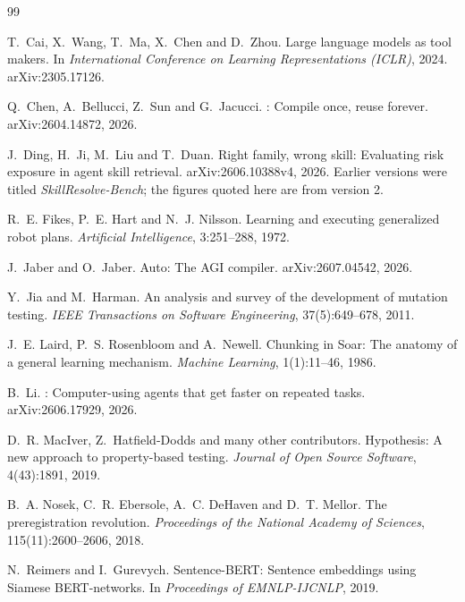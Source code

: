 \documentclass[11pt]{article}
\begin{document}
\begin{thebibliography}{99}

T.~Cai, X.~Wang, T.~Ma, X.~Chen and D.~Zhou.
\newblock Large language models as tool makers.
\newblock In \emph{International Conference on Learning Representations (ICLR)}, 2024.
\newblock arXiv:2305.17126.

Q.~Chen, A.~Bellucci, Z.~Sun and G.~Jacucci.
: Compile once, reuse forever.
\newblock arXiv:2604.14872, 2026.

J.~Ding, H.~Ji, M.~Liu and T.~Duan.
\newblock Right family, wrong skill: Evaluating risk exposure in agent skill retrieval.
\newblock arXiv:2606.10388v4, 2026. Earlier versions were titled \emph{SkillResolve-Bench}; the
figures quoted here are from version 2.

R.~E. Fikes, P.~E. Hart and N.~J. Nilsson.
\newblock Learning and executing generalized robot plans.
\newblock \emph{Artificial Intelligence}, 3:251--288, 1972.

J.~Jaber and O.~Jaber.
\newblock Auto: The {AGI} compiler.
\newblock arXiv:2607.04542, 2026.

Y.~Jia and M.~Harman.
\newblock An analysis and survey of the development of mutation testing.
\newblock \emph{IEEE Transactions on Software Engineering}, 37(5):649--678, 2011.

J.~E. Laird, P.~S. Rosenbloom and A.~Newell.
\newblock Chunking in {Soar}: The anatomy of a general learning mechanism.
\newblock \emph{Machine Learning}, 1(1):11--46, 1986.

B.~Li.
: Computer-using agents that get faster on repeated tasks.
\newblock arXiv:2606.17929, 2026.

D.~R. MacIver, Z.~Hatfield-Dodds and many other contributors.
\newblock Hypothesis: A new approach to property-based testing.
\newblock \emph{Journal of Open Source Software}, 4(43):1891, 2019.

B.~A. Nosek, C.~R. Ebersole, A.~C. DeHaven and D.~T. Mellor.
\newblock The preregistration revolution.
\newblock \emph{Proceedings of the National Academy of Sciences}, 115(11):2600--2606, 2018.

N.~Reimers and I.~Gurevych.
\newblock Sentence-{BERT}: Sentence embeddings using {Siamese} {BERT}-networks.
\newblock In \emph{Proceedings of EMNLP-IJCNLP}, 2019.


\end{thebibliography}
\end{document}
